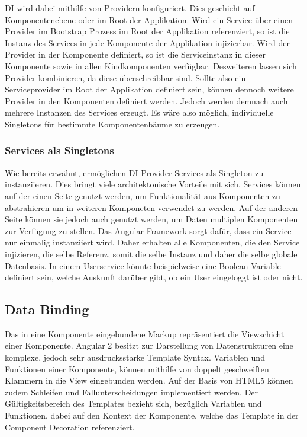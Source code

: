 \ac{DI} wird dabei mithilfe von Providern konfiguriert.
Dies geschieht auf Komponentenebene oder im Root der Applikation.
Wird ein Service über einen Provider im Bootstrap Prozess im Root der Applikation referenziert,
so ist die Instanz des Services in jede Komponente der Applikation injizierbar.
Wird der Provider in der Komponente definiert, so ist die Serviceinstanz in dieser Komponente sowie in
allen Kindkomponenten verfügbar. Desweiteren lassen sich Provider kombinieren, da diese überschreibbar sind.
Sollte also ein Serviceprovider im Root der Applikation definiert sein, können dennoch weitere Provider in den Komponenten definiert werden.
Jedoch werden demnach auch mehrere Instanzen des Services erzeugt.
Es wäre also möglich, individuelle Singletons für bestimmte Komponentenbäume zu erzeugen. \cite[286]{Angular2}

\vspace{0.2cm}

\vspace{0.2cm}

\vspace{0.2cm}

\vspace{0.2cm}


\subsubsection{Services als Singletons}
\label{Services-als-Singletons}

Wie bereits erwähnt, ermöglichen \ac{DI} Provider Services als Singleton zu instanziieren.
Dies bringt viele architektonische Vorteile mit sich. Services können auf der einen Seite genutzt werden,
um Funktionalität aus Komponenten zu abstrahieren um in weiteren Komponeten verwendet zu werden.
Auf der anderen Seite können sie jedoch auch genutzt werden, um Daten multiplen Komponenten zur Verfügung zu stellen.
Das Angular Framework sorgt dafür, dass ein Service nur einmalig instanziiert wird. Daher erhalten alle
Komponenten, die den Service injizieren, die selbe Referenz, somit die selbe Instanz und daher die selbe globale Datenbasis.
In einem Userservice könnte beispielweise eine Boolean Variable definiert sein, welche Auskunft darüber gibt,
ob ein User eingeloggt ist oder nicht. \cite[308]{Angular2}


\subsection{Data Binding}
Das in eine Komponente eingebundene Markup repräsentiert die Viewschicht einer Komponente.
Angular 2 besitzt zur Darstellung von Datenstrukturen eine komplexe, jedoch sehr ausdrucksstarke Template Syntax.
Variablen und Funktionen einer Komponente, können mithilfe von doppelt geschweiften Klammern in die View eingebunden werden.
Auf der Basis von HTML5 können zudem Schleifen und Fallunterscheidungen implementiert werden.
Der Gültigkeitsbereich des Templates bezieht sich, bezüglich Variablen und Funktionen, dabei auf den Kontext der Komponente,
welche das Template in der Component Decoration referenziert. \cite{Templ78:online}

